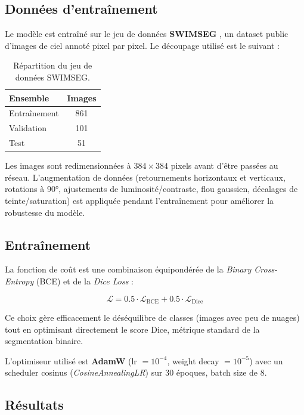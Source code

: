 \subsection{Données d'entraînement}

Le modèle est entraîné sur le jeu de données \textbf{SWIMSEG}
\cite{swimseg}, un dataset public d'images de ciel annoté pixel par pixel.
Le découpage utilisé est le suivant :

\begin{table}[H]
  \centering
  \caption{Répartition du jeu de données SWIMSEG.}
  \label{tab:dataset}
  \begin{tabular}{lc}
    \toprule
    \textbf{Ensemble} & \textbf{Images} \\
    \midrule
    Entraînement & 861 \\
    Validation   & 101 \\
    Test         & 51  \\
    \bottomrule
  \end{tabular}
\end{table}

Les images sont redimensionnées à $384 \times 384$ pixels avant d'être
passées au réseau. L'augmentation de données (retournements horizontaux
et verticaux, rotations à 90°, ajustements de luminosité/contraste,
flou gaussien, décalages de teinte/saturation) est appliquée pendant
l'entraînement pour améliorer la robustesse du modèle.

\subsection{Entraînement}

La fonction de coût est une combinaison équipondérée de la
\textit{Binary Cross-Entropy} (BCE) et de la \textit{Dice Loss} :

\begin{equation}
  \mathcal{L} = 0.5 \cdot \mathcal{L}_{\text{BCE}} + 0.5 \cdot \mathcal{L}_{\text{Dice}}
\end{equation}

Ce choix gère efficacement le déséquilibre de classes (images avec peu
de nuages) tout en optimisant directement le score Dice, métrique
standard de la segmentation binaire.

L'optimiseur utilisé est \textbf{AdamW} (lr $= 10^{-4}$, weight decay
$= 10^{-5}$) avec un scheduler cosinus (\textit{CosineAnnealingLR})
sur 30 époques, batch size de 8.

\subsection{Résultats}

